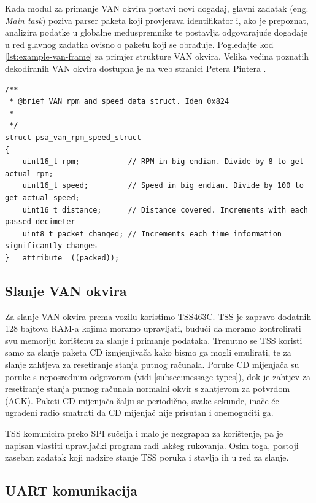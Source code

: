 Kada modul za primanje VAN okvira postavi novi događaj, glavni zadatak (eng. \textit{Main task}) 
poziva parser paketa koji provjerava identifikator i, ako je prepoznat, analizira podatke u globalne međuspremnike 
te postavlja odgovarajuće događaje u red glavnog zadatka ovisno o paketu koji se obrađuje. 
Pogledajte kod \ref{lst:example-van-frame} za primjer strukture VAN okvira. 
Velika većina poznatih dekodiranih VAN okvira dostupna je na web stranici Petera Pintera \cite{vanbus_packets}.

\begin{listing}[H]
  \begin{verbatim}
/**
 * @brief VAN rpm and speed data struct. Iden 0x824
 *
 */
struct psa_van_rpm_speed_struct
{
    uint16_t rpm;           // RPM in big endian. Divide by 8 to get actual rpm;
    uint16_t speed;         // Speed in big endian. Divide by 100 to get actual speed;
    uint16_t distance;      // Distance covered. Increments with each passed decimeter
    uint8_t packet_changed; // Increments each time information significantly changes
} __attribute__((packed));
  \end{verbatim}
  \caption{Primjer strukture VAN okvira.}
  \label{lst:example-van-frame}
\end{listing}

\subsection{Slanje VAN okvira}

Za slanje VAN okvira prema vozilu koristimo TSS463C. 
TSS je zapravo dodatnih 128 bajtova RAM-a kojima moramo upravljati, budući da moramo kontrolirati svu memoriju korištenu za slanje i primanje podataka.
Trenutno se TSS koristi samo za slanje paketa CD izmjenjivača kako bismo ga mogli emulirati, te za slanje zahtjeva za resetiranje stanja putnog računala. 
Poruke CD mijenjača su poruke s neposrednim odgovorom (vidi \ref{subsec:message-types}), dok je zahtjev za resetiranje stanja putnog računala normalni okvir s zahtjevom za potvrdom (ACK). 
Paketi CD mijenjača šalju se periodično, svake sekunde, inače će ugrađeni radio smatrati da CD mijenjač nije prisutan i onemogućiti ga.

\noindent
TSS komunicira preko SPI sučelja i malo je nezgrapan za korištenje, pa je napisan vlastiti upravljački program radi lakšeg rukovanja. 
Osim toga, postoji zaseban zadatak koji nadzire stanje TSS poruka i stavlja ih u red za slanje.

\subsection{UART komunikacija}

